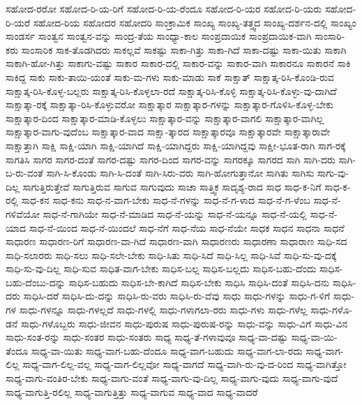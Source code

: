 {ಸಹೋದ-ರರೋ
ಸಹೋದ-ರಿ-ಯ-ರಿಗೆ
ಸಹೋದ-ರಿ-ಯ-ರೆಂದೂ
ಸಹೋದ-ರಿ-ಯರ
ಸಹೋದ-ರಿ-ಯರು
ಸಹೋದ-ರಿ-ಯರೆ
ಸಹೋದ-ರಿಯ
ಸಹೋದರ
ಸಹೋದರಿ
ಸಾಂಕ್ರಾಮಿಕ
ಸಾಂಖ್ಯ
ಸಾಂಖ್ಯ-ತತ್ತ್ವದ
ಸಾಂಖ್ಯ-ದರ್ಶನ-ದಲ್ಲಿ
ಸಾಂಖ್ಯಂ
ಸಾಂಡರ್ಸ
ಸಾಂತ್ವನ
ಸಾಂತ್ವನ-ವನ್ನು
ಸಾಂದ್ರ-ತೆಯ
ಸಾಂಧ್ಯಾ-ಕಾಲ
ಸಾಂಪ್ರದಾಯಿಕ
ಸಾಂಪ್ರದಾಯಿಕ-ವಾಗಿ
ಸಾಂಸಾರಿ-ಕರು
ಸಾಂಸಾರಿಕ
ಸಾಕ-ತೊಡಗಿದರು
ಸಾಕಲ್ಲವೆ
ಸಾಕಷ್ಟು
ಸಾಕಾ-ಗಿತ್ತು
ಸಾಕಾ-ಗಿದೆ
ಸಾಕಾ-ದಷ್ಟು
ಸಾಕಾ-ಯಿತು
ಸಾಕಾಗಿ
ಸಾಕಾಗಿ-ಹೋ-ಗಿತ್ತು
ಸಾಕಾಗು-ವಷ್ಟು
ಸಾಕಾರ
ಸಾಕಾರ-ದಲ್ಲಿ
ಸಾಕಾರ-ವನ್ನು
ಸಾಕಾರ-ವಾಗಿ
ಸಾಕಾರನೂ
ಸಾಕಾರನೆ
ಸಾಕಿ
ಸಾಕಿದ್ದ
ಸಾಕು
ಸಾಕು-ತಾಯಿ-ಯಂತೆ
ಸಾಕು-ಮ-ಗಳು
ಸಾಕು-ಮಾಡು
ಸಾಕೆ
ಸಾಕ್ಷಾತ್
ಸಾಕ್ಷಾತ್ಕ-ರಿಸಿ-ಕೊಂಡಿ-ರುವ
ಸಾಕ್ಷಾತ್ಕ-ರಿಸಿ-ಕೊಳ್ಳ-ಬಲ್ಲರು
ಸಾಕ್ಷಾತ್ಕ-ರಿಸಿ-ಕೊಳ್ಳಲಾ-ರದೆ
ಸಾಕ್ಷಾತ್ಕ-ರಿಸಿ-ಕೊಳ್ಳಿ
ಸಾಕ್ಷಾತ್ಕ-ರಿಸಿ-ಕೊಳ್ಳು-ವು-ದಾಗಿದೆ
ಸಾಕ್ಷಾತ್ಕಾ-ರಕ್ಕೆ
ಸಾಕ್ಷಾತ್ಕಾ-ರಿಸಿ-ಕೊಳ್ಳುವರೋ
ಸಾಕ್ಷಾತ್ಕಾರ
ಸಾಕ್ಷಾತ್ಕಾರ-ಗಳನ್ನು
ಸಾಕ್ಷಾತ್ಕಾರ-ಗೊಳಿಸಿ-ಕೊಳ್ಳ-ಬೇಕು
ಸಾಕ್ಷಾತ್ಕಾರ-ದಿಂದ
ಸಾಕ್ಷಾತ್ಕಾರ-ಮಾಡಿ-ಕೊಳ್ಳಲು
ಸಾಕ್ಷಾತ್ಕಾರ-ವನ್ನು
ಸಾಕ್ಷಾತ್ಕಾರ-ವಾಗಲಿ
ಸಾಕ್ಷಾತ್ಕಾರ-ವಾಗಿಲ್ಲ
ಸಾಕ್ಷಾತ್ಕಾರ-ವಾಗು-ವುದೆಂಬ
ಸಾಕ್ಷಾತ್ಕಾರ-ವಾದ
ಸಾಕ್ಷಾ-ತ್ಕಾರದ
ಸಾಕ್ಷಾತ್ಕಾರವೂ
ಸಾಕ್ಷಾತ್ಕಾರವೇ
ಸಾಕ್ಷಾತ್ಕಾರಾವೇ
ಸಾಕ್ಷಾತ್ತಾಗಿ
ಸಾಕ್ಷಿ
ಸಾಕ್ಷಿ-ಯಾಗಿ
ಸಾಕ್ಷಿ-ಯಾಗಿದೆ
ಸಾಕ್ಷಿ-ಯಾಗಿದ್ದರು
ಸಾಕ್ಷಿ-ಯಾಗಿದ್ದವು
ಸಾಕ್ಷೀ-ಭೂತ-ರಾಗಿ
ಸಾಗ-ರಕ್ಕೆ
ಸಾಗತಿಸಿ
ಸಾಗರ
ಸಾಗರ-ದಂತೆ
ಸಾಗರ-ದಷ್ಟು
ಸಾಗರ-ದಿಂದ
ಸಾಗರ-ವನ್ನು
ಸಾಗರಕ್ಕೂ
ಸಾಗರದ
ಸಾಗಿ
ಸಾಗಿ-ದರು
ಸಾಗಿ-ಬ-ರು-ವಂತೆ
ಸಾಗಿ-ಸಿ-ಕೊಂಡು
ಸಾಗಿ-ಸಿ-ದಂತೆ
ಸಾಗಿ-ಸಿರು-ವರು
ಸಾಗಿ-ಹೋಗುತ್ತಾನೋ
ಸಾಗಿತು
ಸಾಗಿಸು
ಸಾಗು-ವು-ದಿಲ್ಲ
ಸಾಗುತ್ತಿರುತ್ತೇವೆ
ಸಾಗುತ್ತಿರುವ
ಸಾಗುವ
ಸಾಗುವುದು
ಸಾಚಾ
ಸಾತ್ತ್ವಿಕ
ಸಾದೃಶ್ಯ-ರಾದ
ಸಾಧ
ಸಾಧ-ಕ-ನಿಗೆ
ಸಾಧ-ಕ-ರಲ್ಲಿ
ಸಾಧ-ಕನ
ಸಾಧ-ಕನು
ಸಾಧ-ನ-ವಾಗ-ಬೇಕು
ಸಾಧ-ನೆ-ಗಳನ್ನು
ಸಾಧ-ನೆ-ಗ-ಳಾದ
ಸಾಧ-ನೆ-ಗ-ಳೆಂಬ
ಸಾಧ-ನೆ-ಗಳಿವೆಯೋ
ಸಾಧ-ನೆ-ಗಾಗಿಯೇ
ಸಾಧ-ನೆ-ಮಾಡಿದ
ಸಾಧ-ನೆ-ಯನ್ನು
ಸಾಧ-ನೆ-ಯನ್ನೂ
ಸಾಧ-ನೆ-ಯಲ್ಲಿ
ಸಾಧ-ನೆ-ಯಾದ
ಸಾಧ-ನೆ-ಯಿಂದ
ಸಾಧ-ನೆ-ಯಿಂದಲೆ
ಸಾಧ-ನೆಗೆ
ಸಾಧ-ನೆಯ
ಸಾಧ-ನೆಯೇ
ಸಾಧಕ
ಸಾಧನ
ಸಾಧನಾ
ಸಾಧನೆ
ಸಾಧಾರಣ
ಸಾಧಾರಣ-ರಿಗೆ
ಸಾಧಾರಣ-ವಾ-ಗಿದೆ
ಸಾಧಾರಣ-ವಾಗಿ
ಸಾಧಾರಣರು
ಸಾಧಾರಣಾ
ಸಾಧಾರಾಣ
ಸಾಧಿ-ಸದ
ಸಾಧಿ-ಸಲಾರರು
ಸಾಧಿ-ಸಲು
ಸಾಧಿ-ಸಲೇ-ಬೇಕು
ಸಾಧಿ-ಸಿತು
ಸಾಧಿ-ಸಿದೆ
ಸಾಧಿ-ಸಿಲ್ಲ
ಸಾಧಿ-ಸಿವೆ
ಸಾಧಿ-ಸು-ವು-ದಕ್ಕೆ
ಸಾಧಿ-ಸು-ವು-ದಿಲ್ಲ
ಸಾಧಿ-ಸುವ
ಸಾಧಿತ-ವಾಗ-ಬೇಕು
ಸಾಧಿಸ-ಬಲ್ಲ
ಸಾಧಿಸ-ಬಲ್ಲದು
ಸಾಧಿಸ-ಬಹು-ದೆಂದು
ಸಾಧಿಸ-ಬಹು-ದೆಂಬು-ದನ್ನು
ಸಾಧಿಸ-ಬಹುದು
ಸಾಧಿಸ-ಬೇ-ಕಾಗಿದೆ
ಸಾಧಿಸ-ಬೇಕು
ಸಾಧಿಸಿ
ಸಾಧಿಸಿ-ದಂತೆ
ಸಾಧಿಸಿ-ದನು
ಸಾಧಿಸಿ-ದರು
ಸಾಧಿಸಿ-ದರೆ
ಸಾಧಿಸಿ-ದು-ದನ್ನು
ಸಾಧಿಸಿ-ರು-ವರು
ಸಾಧಿಸಿ-ರು-ವೆವು
ಸಾಧು
ಸಾಧು-ಗಳನ್ನು
ಸಾಧು-ಗ-ಳಿಗೆ
ಸಾಧು-ಗಳ
ಸಾಧು-ಗಳನ್ನೂ
ಸಾಧು-ಗಳಲ್ಲದೆ
ಸಾಧು-ಗಳಲ್ಲಿ
ಸಾಧು-ಗಳಾಗಲಾ-ರರು
ಸಾಧು-ಗಳು
ಸಾಧು-ಗಳೆಲ್ಲ
ಸಾಧು-ಗಳೊ-ಡನೆ
ಸಾಧು-ಗಳೊಬ್ಬರು
ಸಾಧು-ಜೀವನ
ಸಾಧು-ಪುರುಷ
ಸಾಧು-ಪುರುಷ-ರನ್ನು
ಸಾಧು-ವನ್ನು
ಸಾಧು-ವಿಗೆ
ಸಾಧು-ವಿನ
ಸಾಧು-ಸಂತ-ರನ್ನು
ಸಾಧು-ಸಂತರ
ಸಾಧು-ಸಂತರು
ಸಾಧ್ಯ
ಸಾಧ್ಯ-ತೆ-ಗಳಾವುವೂ
ಸಾಧ್ಯ-ವಾ-ದಷ್ಟು
ಸಾಧ್ಯ-ವಾ-ಯಿ-ತೆಂದೂ
ಸಾಧ್ಯ-ವಾ-ಯಿತು
ಸಾಧ್ಯ-ವಾಗ-ಬಹು-ದೆಂದೂ
ಸಾಧ್ಯ-ವಾಗ-ಬಹುದು
ಸಾಧ್ಯ-ವಾಗ-ಲಾ-ರದು
ಸಾಧ್ಯ-ವಾಗ-ಲಿಲ್ಲ
ಸಾಧ್ಯ-ವಾಗ-ಲಿಲ್ಲ-ವಲ್ಲ
ಸಾಧ್ಯ-ವಾಗ-ಲಿಲ್ಲವೋ
ಸಾಧ್ಯ-ವಾಗದೆ
ಸಾಧ್ಯ-ವಾಗಿ-ರು-ವು-ದ-ರಿಂದ
ಸಾಧ್ಯ-ವಾಗಿತ್ತೋ
ಸಾಧ್ಯ-ವಾಗು-ವಂತಿರ-ಬೇಕು
ಸಾಧ್ಯ-ವಾಗು-ವಂತೆ
ಸಾಧ್ಯ-ವಾಗು-ವು-ದಿಲ್ಲ
ಸಾಧ್ಯ-ವಾಗು-ವುದು
ಸಾಧ್ಯ-ವಾಗು-ವುದೆ
ಸಾಧ್ಯ-ವಾಗುತ್ತಿ-ರಲಿಲ್ಲ
ಸಾಧ್ಯ-ವಾಗುತ್ತಿತ್ತು
ಸಾಧ್ಯ-ವಾಗುವ
ಸಾಧ್ಯ-ವಾದ
ಸಾಧ್ಯ-ವಾದರೆ
}
